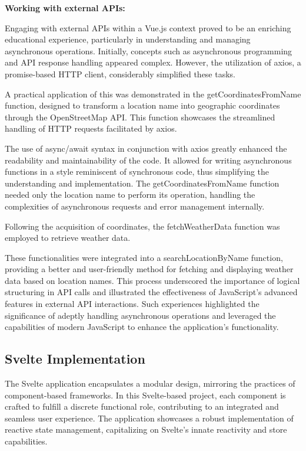 \textbf{Working with external APIs:}

Engaging with external APIs within a Vue.js context proved to be an enriching educational experience, particularly in understanding and managing asynchronous operations. Initially, concepts such as asynchronous programming and API response handling appeared complex. However, the utilization of axios, a promise-based HTTP client, considerably simplified these tasks.

A practical application of this was demonstrated in the getCoordinatesFromName function, designed to transform a location name into geographic coordinates through the OpenStreetMap API. This function showcases the streamlined handling of HTTP requests facilitated by axios.



The use of async/await syntax in conjunction with axios greatly enhanced the readability and maintainability of the code. It allowed for writing asynchronous functions in a style reminiscent of synchronous code, thus simplifying the understanding and implementation. The getCoordinatesFromName function needed only the location name to perform its operation, handling the complexities of asynchronous requests and error management internally.

Following the acquisition of coordinates, the fetchWeatherData function was employed to retrieve weather data. 

These functionalities were integrated into a searchLocationByName function, providing a better and user-friendly method for fetching and displaying weather data based on location names. This process underscored the importance of logical structuring in API calls and illustrated the effectiveness of JavaScript's advanced features in external API interactions. Such experiences highlighted the significance of adeptly handling asynchronous operations and leveraged the capabilities of modern JavaScript to enhance the application's functionality.



\subsection{Svelte Implementation}

The Svelte application encapsulates a modular design, mirroring the practices of component-based frameworks. In this Svelte-based project, each component is crafted to fulfill a discrete functional role, contributing to an integrated and seamless user experience. The application showcases a robust implementation of reactive state management, capitalizing on Svelte's innate reactivity and store capabilities.

